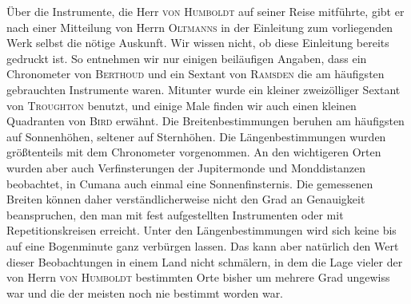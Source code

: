 Über die Instrumente, die Herr \textsc{von Humboldt} auf seiner Reise mitführte, gibt er nach einer Mitteilung von Herrn \textsc{Oltmanns} in der Einleitung zum vorliegenden Werk selbst die nötige Auskunft. Wir wissen nicht, ob diese Einleitung bereits gedruckt ist. So entnehmen wir nur einigen beiläufigen Angaben, dass ein Chronometer von \textsc{Berthoud} und ein Sextant von \textsc{Ramsden} die am häufigsten gebrauchten Instrumente waren. Mitunter wurde ein kleiner zweizölliger Sextant von \textsc{Troughton} benutzt, und einige Male finden wir auch einen kleinen Quadranten von \textsc{Bird} erwähnt. Die Breitenbestimmungen beruhen am häufigsten auf Sonnenhöhen, seltener auf Sternhöhen. Die Längenbestimmungen wurden größtenteils mit dem Chronometer vorgenommen. An den wichtigeren Orten wurden aber auch Verfinsterungen der Jupitermonde und Monddistanzen beobachtet, in Cumana auch einmal eine Sonnenfinsternis. Die gemessenen Breiten können daher verständlicherweise nicht den Grad an Genauigkeit beanspruchen, den man mit fest aufgestellten Instrumenten oder mit Repetitionskreisen erreicht. Unter den Längenbestimmungen wird sich keine bis auf eine Bogenminute ganz verbürgen lassen. Das kann aber natürlich den Wert dieser Beobachtungen in einem Land nicht schmälern, in dem die Lage vieler der von Herrn \textsc{von Humboldt} bestimmten Orte bisher um mehrere Grad ungewiss war und die der meisten noch nie bestimmt worden war.

